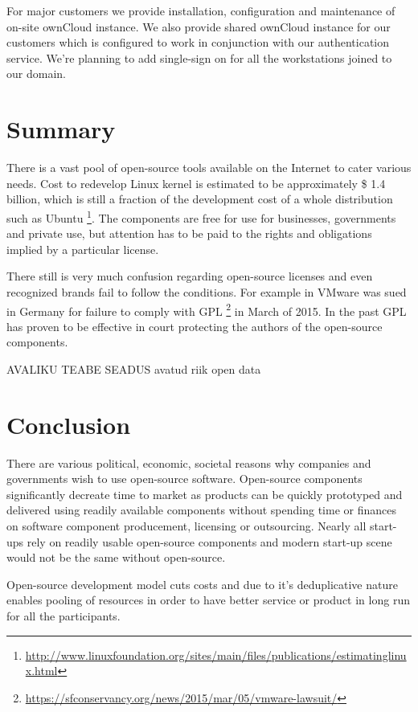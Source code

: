 \documentclass{article}
\begin{document}
For major customers we provide installation,
configuration and maintenance of on-site ownCloud instance.
We also provide shared ownCloud instance
for our customers which is configured to work
in conjunction with our authentication service.
We're planning to add single-sign on
for all the workstations joined to our domain.



\section{Summary}

There is a vast pool of open-source tools available on the Internet
to cater various needs.
Cost to redevelop Linux kernel is estimated to be
approximately \$ 1.4 billion, which is still a fraction
of the development cost of a whole distribution such as Ubuntu
\footnote{\url{
http://www.linuxfoundation.org/sites/main/files/publications/estimatinglinux.html}}.
The components are free for use for businesses, governments and
private use, but attention has to be paid to the rights
and obligations implied by a particular license.

There still is very much confusion regarding open-source licenses
and even recognized brands fail to follow the conditions.
For example in VMware was sued in Germany for failure to comply with GPL
\footnote{\url{https://sfconservancy.org/news/2015/mar/05/vmware-lawsuit/}} in March of 2015.
In the past GPL has proven to be effective in court protecting
the authors of the open-source components.


AVALIKU TEABE SEADUS
avatud riik
open data


\section{Conclusion}

There are various political, economic, societal reasons why
companies and governments wish to use open-source software.
Open-source components significantly decreate time to market
as products can be quickly prototyped and delivered using
readily available components without spending time or finances on
software component producement, licensing or outsourcing.
Nearly all start-ups rely on readily usable open-source
components and modern start-up scene would not be the same
without open-source.

Open-source development model cuts costs and due to
it's deduplicative nature enables pooling of resources 
in order to have better service or product in long run
for all the participants.
\end{document}

